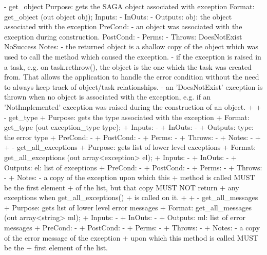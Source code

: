 \begin{myspec}
 
    - get_object
      Purpose:  gets the SAGA object associated with exception
      Format:   get_object     (out object obj);
      Inputs:   -
      InOuts:   -
      Outputs:  obj:            the object associated with the
                                exception
      PreCond:  - an object was associated with the exception
                  during construction.
      PostCond: -
      Perms:    -
      Throws:   DoesNotExist
                NoSuccess
      Notes:    - the returned object is a shallow copy of the 
                  object which was used to call the method which 
                  caused the exception.
                - if the exception is raised in a task, e.g. on
                  task.rethrow(), the object is the one which the
                  task was created from.  That allows the
                  application to handle the error condition 
                  without the need to always keep track of 
                  object/task relationships.
                - an 'DoesNotExist' exception is thrown when no
                  object is associated with the exception, e.g. 
                  if an 'NotImplemented' exception was raised 
                  during the construction of an object.
+
+   - get_type
+     Purpose:  gets the type associated with the exception    
+     Format:   get_type      (out exception_type type);
+     Inputs:   -
+     InOuts:   -
+     Outputs:  type:          the error type
+     PreCond:  -
+     PostCond: -
+     Perms:    -
+     Throws:   -
+     Notes:    - 
+
+   - get_all_exceptions
+     Purpose:  gets list of lower level exceptions
+     Format:   get_all_exceptions (out array<exception> el);
+     Inputs:   -
+     InOuts:   -
+     Outputs:  el:            list of exceptions
+     PreCond:  -
+     PostCond: -
+     Perms:    -
+     Throws:   -
+     Notes:    - a copy of the exception upon which this 
+                 method is called MUST be the first element 
+                 of the list, but that copy MUST NOT return 
+                 any exceptions when get_all_exceptions()
+                 is called on it.
+
+   - get_all_messages
+     Purpose:  gets list of lower level error messages
+     Format:   get_all_messages    (out array<string> ml);
+     Inputs:   -
+     InOuts:   -
+     Outputs:  ml:            list of error messages
+     PreCond:  -
+     PostCond: -
+     Perms:    -
+     Throws:   -
+     Notes:    - a copy of the error message of the exception 
+                 upon which this method is called MUST be the 
+                 first element of the list.
 \end{myspec}
 
